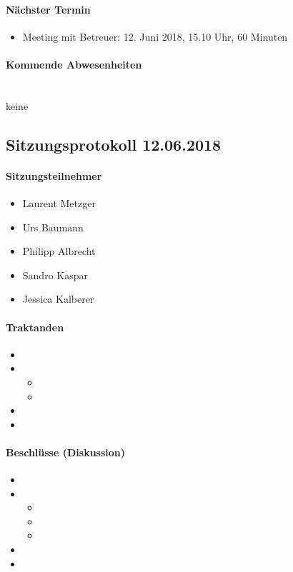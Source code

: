 \paragraph{Nächster Termin}
\begin{itemize}	
	\item Meeting mit Betreuer: 12. Juni 2018, 15.10 Uhr, 60 Minuten
\end{itemize}

\paragraph{Kommende Abwesenheiten} \mbox{}\\
keine


\newpage


\subsection{Sitzungsprotokoll 12.06.2018}

\paragraph{Sitzungsteilnehmer}
\begin{itemize}	
	\item Laurent Metzger 
	\item Urs Baumann
	\item Philipp Albrecht
	\item Sandro Kaspar
	\item Jessica Kalberer
\end{itemize}

\paragraph{Traktanden}
\begin{itemize}	
	\item 
	\item 
	\begin{itemize}
		\item 
		\item 
	\end{itemize}
	\item 
	\item 
\end{itemize}

\paragraph{Beschlüsse (Diskussion)}
\begin{itemize}	
	\item 
	\item 
	\begin{itemize}
		\item 
		\item 
		\item 
	\end{itemize}
	\item 
	\item 
\end{itemize}

